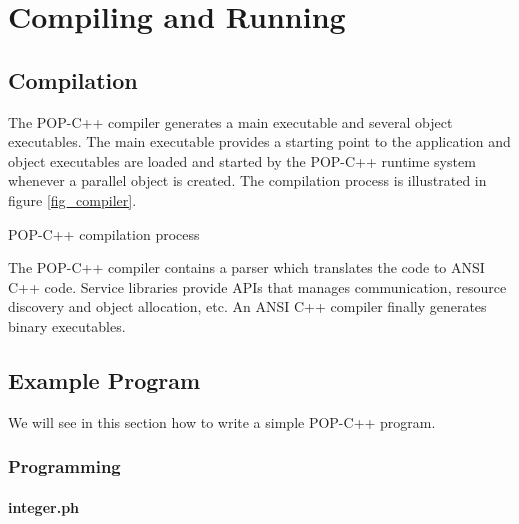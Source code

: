 \chapter{Compiling and Running}



\section{Compilation}

The POP-C++ compiler generates a main executable and several object executables. 
The main executable provides a starting point to the application and object executables are loaded and started by the POP-C++ runtime system whenever a parallel object is created. The compilation process is illustrated in figure \ref{fig_compiler}.


{POP-C++ compilation process}

The POP-C++ compiler contains a parser which translates the
code to ANSI C++ code. Service libraries provide APIs that manages communication,
resource discovery and object allocation, etc. An ANSI C++ compiler finally
generates binary executables.


\section{Example Program}

We will see in this section how to write a simple POP-C++ program. 

\subsection{Programming}
\subsubsection{integer.ph}

